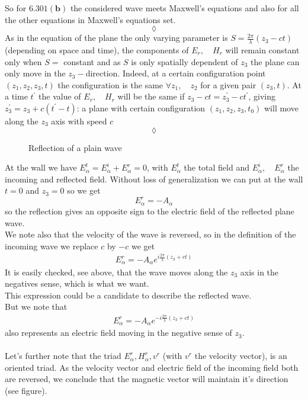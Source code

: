 So for $\mathbf{6.301 (b)}$ the considered wave meets Maxwell's equations and also for all the other equations in Maxwell's equations set.\\
$$\lozenge$$
As in the equation of the plane the only varying parameter is $S=\frac{2\pi}{\lambda}\left(z_3-ct\right)$  (depending on space and time), the components of $E_r, \quad H_r$ will remain constant only when $S= $ constant and as $S$ is  only spatially dependent of $z_3$ the plane can only move in the $z_3-$direction. Indeed, at a certain configuration point $(z_1,z_2,z_3,t)$ the configuration is the same $\forall z_1,\quad z_2$ for a given pair $(z_3,t)$. At a time $t^{'}$ the value of $E_r,\quad H_r$ will be the same if $z_3-ct= z^{'}_3-ct^{'}$, giving $z^{'}_3=z_3+ c(t^{'}- t)$:  a plane with certain configuration $(z_1,z_2,z_3,t_0)$ will move along the $z_3$ axis with speed $c$
$$\lozenge$$
\begin{figure}[H]%
    \centering

\caption{Reflection of a plain wave }
\label{fig:fig_p237}
\end{figure}
At the wall we have $E^{t}_{\alpha}=E^{i}_{\alpha}+E^{r}_{\alpha}=0$, with $E^{t}_{\alpha}$ the total field and $E^{i}_{\alpha},\quad E^{r}_{\alpha}  $ the incoming and reflected field. Without loss of generalization we can put at the wall $t=0$ and $z_3=0$ so we get 
$$ E^{r}_{\alpha}=-A_{\alpha}$$
so the reflection gives an opposite sign to the electric field of the reflected plane wave.\\
We note also that the velocity of the wave is reversed, so in the definition of the incoming wave we replace $c$ by $-c$ we get
\begin{align}
E^r_{\alpha}=-A_{\alpha}e^{i\frac{2\pi}{\lambda}\left(z_3+ct\right)}
\end{align} It is easily checked, see above, that the wave moves along the $z_3$ axis in the negatives sense, which is what we want.\\
This expression could be a candidate to describe the reflected wave. 
\\But we note that 
\begin{align}
E^r_{\alpha}=-A_{\alpha}e^{-i\frac{2\pi}{\lambda}\left(z_3+ct\right)}
\end{align}
also represents an electric field moving in the negative sense of $z_3$.\\\\
Let's further note that the triad $E^r_{\alpha},H^r_{\alpha}, v^r$ (with $v^r$ the velocity vector), is an oriented triad. As the velocity vector and electric field of the incoming field both are reversed, we conclude that the magnetic vector will maintain it's direction (see figure).\\
